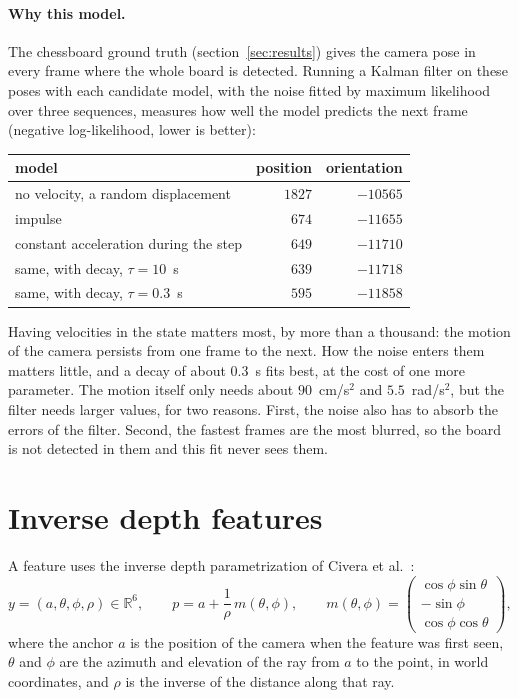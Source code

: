\documentclass[11pt]{article}
\newcommand{\R}{\mathbb{R}}
\begin{document}
\paragraph{Why this model.}
The chessboard ground truth (section~\ref{sec:results}) gives the camera pose in every frame where
the whole board is detected. Running a Kalman filter on these poses with each candidate model, with
the noise fitted by maximum likelihood over three sequences, measures how well the model predicts
the next frame (negative log-likelihood, lower is better):

\begin{center}
\begin{tabular}{lrr}
  model & position & orientation \\
  \hline
  no velocity, a random displacement & $1827$ & $-10565$ \\
  impulse~\cite{davison2007} & $674$ & $-11655$ \\
  constant acceleration during the step & $649$ & $-11710$ \\
  same, with decay, $\tau = 10$~s & $639$ & $-11718$ \\
  same, with decay, $\tau = 0.3$~s & $595$ & $-11858$ \\
\end{tabular}
\end{center}

Having velocities in the state matters most, by more than a thousand: the motion of the camera
persists from one frame to the next. How the noise enters them matters little, and a decay of about
$0.3$~s fits best, at the cost of one more parameter. The motion itself only needs about
$90$~cm/s$^2$ and $5.5$~rad/s$^2$, but the filter needs larger values, for two reasons. First, the
noise also has to absorb the errors of the filter. Second, the fastest frames are the most blurred,
so the board is not detected in them and this fit never sees them.

\section{Inverse depth features}
\label{sec:idp}

A feature uses the inverse depth parametrization of Civera et al.~\cite{civera2008}:
\begin{equation}
  y = (a, \theta, \phi, \rho) \in \R^6,
  \qquad
  p = a + \frac{1}{\rho}\, m(\theta, \phi),
  \qquad
  m(\theta, \phi) = \begin{pmatrix} \cos\phi \sin\theta \\ -\sin\phi \\ \cos\phi \cos\theta \end{pmatrix},
\end{equation}
where the anchor $a$ is the position of the camera when the feature was first seen, $\theta$ and
$\phi$ are the azimuth and elevation of the ray from $a$ to the point, in world coordinates, and
$\rho$ is the inverse of the distance along that ray.
\end{document}
